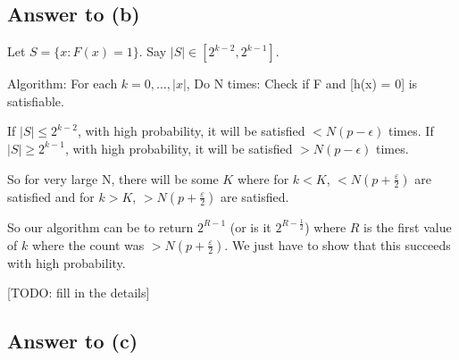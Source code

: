 \documentclass{article}
\def \eps {{\varepsilon}}
\begin{document}




%

\newpage
\subsection*{Answer to (b)}
Let $S = \{x : F(x) = 1\}$.
Say $|S| \in [2^{k-2}, 2^{k-1}]$.

Algorithm:
For each $k = 0, \dots, |x|$,
	Do N times:
		Check if F and [h(x) = 0] is satisfiable.

	If $|S| \leq 2^{k-2}$, with high probability, it will be satisfied $< N(p - \epsilon)$ times.
	If $|S| \geq 2^{k-1}$, with high probability, it will be satisfied $> N(p - \epsilon)$ times.

So for very large N, there will be some $K$ where for $k < K$, $< N(p + \frac{\eps}{2})$ are satisfied and for $k > K$, $> N(p + \frac{\eps}{2})$ are satisfied.

So our algorithm can be to return $2^{R - 1}$ (or is it $2^{R - \frac{1}{2}}$) where $R$ is the first value of $k$ where the count was $> N(p + \frac{\eps}{2})$.  We just have to show that this succeeds with high probability.

[TODO: fill in the details]

\newpage
\subsection*{Answer to (c)}
\end{document}
